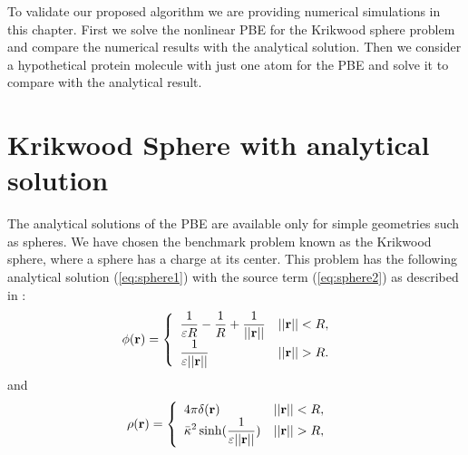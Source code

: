 To validate our proposed algorithm we are providing numerical simulations in this chapter. First we solve the nonlinear PBE for the Krikwood sphere problem and compare the numerical results with the analytical solution. Then we consider a hypothetical protein molecule with just one atom for the PBE and solve it to compare with the analytical result. 


\section{Krikwood Sphere with analytical solution}
\label{krik}

The analytical solutions of the PBE are available only for simple geometries such as spheres. We have chosen the benchmark problem known as the Krikwood sphere, where a sphere has a charge at its center. This problem has the following analytical solution  (\ref{eq:sphere1}) with the source term (\ref{eq:sphere2}) as described in \cite{Geng2013_Fully}: 
\begin{align}
	\phi({\bf r})&=\left\{\begin{array}{lc}\displaystyle\frac{1}{\varepsilon R}-\frac{1}{R}+\displaystyle\frac{1}{||{\bf r}||} & ||{\bf r}||<R, \\
	\displaystyle\frac{1}{\varepsilon ||{\bf r}||}& ||{\bf r}||>R.\end{array}\right.\label{eq:sphere1}
\end{align}
and
\begin{align}
	\rho({\bf r})&=\left\{\begin{array}{lc}4\pi \delta ({\bf r)} & ||{\bf r}||<R, \\ \displaystyle\bar{\kappa}^2\sinh (\frac{1}{\varepsilon ||{\bf r}||}) & ||{\bf r}||>R,\end{array}\right.\label{eq:sphere2}
\end{align}
